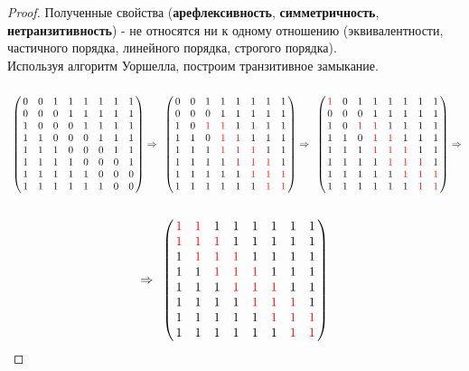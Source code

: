 \begin{proof}
Полученные свойства (\textbf{арефлексивность}, \textbf{симметричность}, \textbf{нетранзитивность}) - не относятся ни к одному отношению (эквивалентности, частичного порядка, линейного порядка, строгого порядка).
 \\Используя алгоритм Уоршелла, построим транзитивное замыкание.
$$ \bordermatrix{& \cr
& 0 & 0 & 1 & 1 & 1 & 1 & 1 & 1 \cr
& 0 & 0 & 0 & 1 & 1 & 1 & 1 & 1 \cr
& 1 & 0 & 0 & 0 & 1 & 1 & 1 & 1 \cr
& 1 & 1 & 0 & 0 & 0 & 1 & 1 & 1 \cr
& 1 & 1 & 1 & 0 & 0 & 0 & 1 & 1 \cr
& 1 & 1 & 1 & 1 & 0 & 0 & 0 & 1 \cr
& 1 & 1 & 1 & 1 & 1 & 0 & 0 & 0 \cr
& 1 & 1 & 1 & 1 & 1 & 1 & 0 & 0 }  \Rightarrow
\bordermatrix{& \cr
& 0 & 0 & 1 & 1 & 1 & 1 & 1 & 1 \cr
& 0 & 0 & 0 & 1 & 1 & 1 & 1 & 1 \cr
& 1 & 0 & \textcolor{red}{1} & \textcolor{red}{1} & 1 & 1 & 1 & 1 \cr
& 1 & 1 & 0 & \textcolor{red}{1} & \textcolor{red}{1} & 1 & 1 & 1 \cr
& 1 & 1 & 1 & \textcolor{red}{1} & \textcolor{red}{1} & \textcolor{red}{1} & 1 & 1 \cr
& 1 & 1 & 1 & 1 & \textcolor{red}{1} & \textcolor{red}{1} & \textcolor{red}{1} & 1 \cr
& 1 & 1 & 1 & 1 & 1 & \textcolor{red}{1} & \textcolor{red}{1} & \textcolor{red}{1} \cr
& 1 & 1 & 1 & 1 & 1 & 1 & \textcolor{red}{1} & \textcolor{red}{1} } \Rightarrow
\bordermatrix{& \cr
& \textcolor{red}{1} & 0 & 1 & 1 & 1 & 1 & 1 & 1 \cr
& 0 & 0 & 0 & 1 & 1 & 1 & 1 & 1 \cr
& 1 & 0 & \textcolor{red}{1} & \textcolor{red}{1} & 1 & 1 & 1 & 1 \cr
& 1 & 1 & 0 & \textcolor{red}{1} & \textcolor{red}{1} & 1 & 1 & 1 \cr
& 1 & 1 & 1 & \textcolor{red}{1} & \textcolor{red}{1} & \textcolor{red}{1} & 1 & 1 \cr
& 1 & 1 & 1 & 1 & \textcolor{red}{1} & \textcolor{red}{1} & \textcolor{red}{1} & 1 \cr
& 1 & 1 & 1 & 1 & 1 & \textcolor{red}{1} & \textcolor{red}{1} & \textcolor{red}{1} \cr
& 1 & 1 & 1 & 1 & 1 & 1 & \textcolor{red}{1} & \textcolor{red}{1} } \Rightarrow
$$
$$
 \Rightarrow  
\bordermatrix{& \cr
& \textcolor{red}{1} & \textcolor{red}{1} & 1 & 1 & 1 & 1 & 1 & 1 \cr
& \textcolor{red}{1} & \textcolor{red}{1} & \textcolor{red}{1} & 1 & 1 & 1 & 1 & 1 \cr
& 1 & \textcolor{red}{1} & \textcolor{red}{1} & \textcolor{red}{1} & 1 & 1 & 1 & 1 \cr
& 1 & 1 & \textcolor{red}{1} & \textcolor{red}{1} & \textcolor{red}{1} & 1 & 1 & 1 \cr
& 1 & 1 & 1 & \textcolor{red}{1} & \textcolor{red}{1} & \textcolor{red}{1} & 1 & 1 \cr
& 1 & 1 & 1 & 1 & \textcolor{red}{1} & \textcolor{red}{1} & \textcolor{red}{1} & 1 \cr
& 1 & 1 & 1 & 1 & 1 & \textcolor{red}{1} & \textcolor{red}{1} & \textcolor{red}{1} \cr
& 1 & 1 & 1 & 1 & 1 & 1 & \textcolor{red}{1} & \textcolor{red}{1} }
$$
\end{proof}
